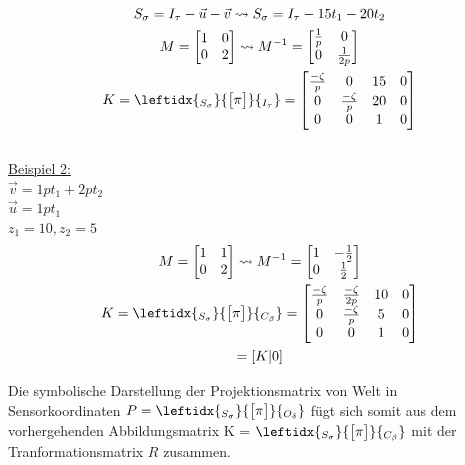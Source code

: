 		\begin{gather}
		S_\sigma = I_\tau - \vec{u} - \vec{v} \leadsto S_\sigma = I_\tau -15 t_1 - 20 t_2\\	
		M= 
		\begin{bmatrix}
		1&0\\
		0&2
		\end{bmatrix}
		\leadsto
		M^{-1}=\begin{bmatrix}
		\frac{1}{p}&0\\
		0&\frac{1}{2p}
		\end{bmatrix}\\
		K =
		\leftidx{_{S_\sigma}}{\begin{bmatrix}
				\pi
		\end{bmatrix}}{_{I_\tau}} = 	
		\begin{bmatrix}
		\frac{-\zeta}{p}&0&15&0\\
		0&\frac{-\zeta}{p}&20&0\\
		0&0&1&0
		\end{bmatrix}
		\end{gather}\\
		
	 	\underline{Beispiel 2:}\\
		
		$\vec{v} = 1pt_1+2pt_2$\\
		$\vec{u} = 1pt_1$\\
		$ z_1 = 10, z_2 = 5$\\
		
		\begin{gather}
		M=\begin{bmatrix}
		1&1\\
		0&2
		\end{bmatrix} \leadsto 
		M^{-1} =
		\begin{bmatrix}
		1&-\frac{1}{2}\\
		0&\frac{1}{2}
		\end{bmatrix} \\
		K = \leftidx{_{S_\sigma}}{\begin{bmatrix}
				\pi
		\end{bmatrix}}{_{C_\beta}}
		= 
		\begin{bmatrix}
		\frac{-\zeta}{p}&\frac{-\zeta}{2p}&10&0\\
		0&\frac{-\zeta}{p}&5&0\\
		0&0&1&0
		\end{bmatrix}\\
		= [K|0]
		\end{gather}
		
		Die symbolische Darstellung der Projektionsmatrix von Welt in Sensorkoordinaten $	P = \leftidx{_{S_\sigma}}{\begin{bmatrix}
			\pi
			\end{bmatrix}}{_{O_\delta}}$ fügt sich somit aus dem vorhergehenden Abbildungsmatrix 
		K = $\leftidx{_{S_\sigma}}{\begin{bmatrix}
				\pi
		\end{bmatrix}}{_{C_\beta}}$ mit der Tranformationsmatrix $R$ zusammen.
		
